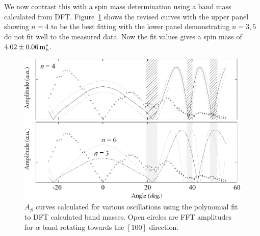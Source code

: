 We now contrast this with a spin mass determination using a band mass calculated from \ac{DFT}. Figure~\ref{Fig:ResD:SpinMassFromDFTBand4} shows the revised curves with the upper panel showing $n=4$ to be the best fitting with the lower panel demonstrating $n = 3, 5$ do not fit well to the measured data. Now the fit values gives a spin mass of $\unit[4.02\pm0.06]{m^*_b}$.
\begin{figure}[htbp]
    \begin{center}
        \includegraphics[scale=0.7]{Chapter-dHvABaFe2P2/Figures/Mass/SpinMassBand4/SpinMassBand4}
        \caption{$A_S$ curves calculated for various oscillations using the polynomial fit to \ac{DFT} calculated band masses. Open circles are \ac{FFT} amplitudes for $\alpha$ band rotating towards the $[100]$ direction.}
        \label{Fig:ResD:SpinMassFromDFTBand4}
    \end{center}
\end{figure}
